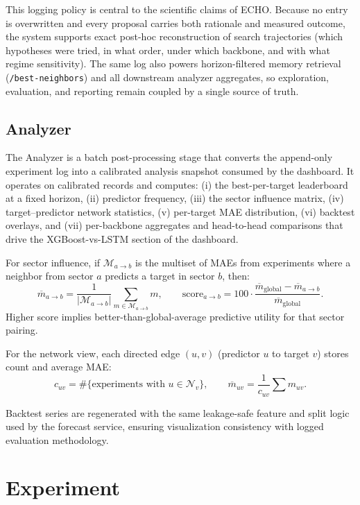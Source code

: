 \documentclass[12pt,a4paper,titlepage]{article}
\begin{document}
This logging policy is central to the scientific claims of ECHO. Because no entry is overwritten and every proposal carries both rationale and measured outcome, the system supports exact post-hoc reconstruction of search trajectories (which hypotheses were tried, in what order, under which backbone, and with what regime sensitivity). The same log also powers horizon-filtered memory retrieval (\texttt{/best-neighbors}) and all downstream analyzer aggregates, so exploration, evaluation, and reporting remain coupled by a single source of truth.

\subsection{Analyzer}

The Analyzer is a batch post-processing stage that converts the append-only experiment log into a calibrated analysis snapshot consumed by the dashboard. It operates on calibrated records and computes: (i) the best-per-target leaderboard at a fixed horizon, (ii) predictor frequency, (iii) the sector influence matrix, (iv) target--predictor network statistics, (v) per-target MAE distribution, (vi) backtest overlays, and (vii) per-backbone aggregates and head-to-head comparisons that drive the XGBoost-vs-LSTM section of the dashboard.

For sector influence, if \(\mathcal{M}_{a\rightarrow b}\) is the multiset of MAEs from experiments where a neighbor from sector \(a\) predicts a target in sector \(b\), then:
\[
\overline{m}_{a\rightarrow b} = \frac{1}{|\mathcal{M}_{a\rightarrow b}|}\sum_{m\in\mathcal{M}_{a\rightarrow b}} m,
\qquad
\text{score}_{a\rightarrow b}=100\cdot\frac{\overline{m}_{\text{global}}-\overline{m}_{a\rightarrow b}}{\overline{m}_{\text{global}}}.
\]
Higher score implies better-than-global-average predictive utility for that sector pairing.

For the network view, each directed edge \((u,v)\) (predictor \(u\) to target \(v\)) stores count and average MAE:
\[
c_{uv}=\#\{\text{experiments with }u\in\mathcal{N}_v\},
\qquad
\overline{m}_{uv}=\frac{1}{c_{uv}}\sum m_{uv}.
\]

Backtest series are regenerated with the same leakage-safe feature and split logic used by the forecast service, ensuring visualization consistency with logged evaluation methodology.


\section{Experiment}
\end{document}

